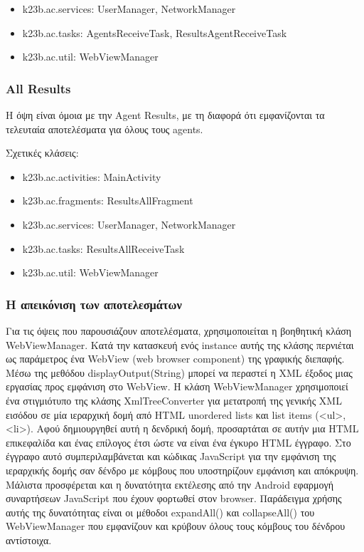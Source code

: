 \documentclass[a4paper,11pt]{article}
\begin{document}
\begin{sloppypar}
\begin{itemize}
\item k23b.ac.services: UserManager, NetworkManager

\item k23b.ac.tasks: AgentsReceiveTask, ResultsAgentReceiveTask

\item k23b.ac.util: WebViewManager

\end{itemize}

\subsubsection{All Results}
Η όψη είναι όμοια με την Agent Results, με τη διαφορά ότι εμφανίζονται τα τελευταία αποτελέσματα για όλους τους agents.
\newline

Σχετικές κλάσεις:

\begin{itemize}

\item k23b.ac.activities: MainActivity

\item k23b.ac.fragments: ResultsAllFragment

\item k23b.ac.services: UserManager, NetworkManager

\item k23b.ac.tasks: ResultsAllReceiveTask

\item k23b.ac.util: WebViewManager

\end{itemize}

\subsubsection{Η απεικόνιση των αποτελεσμάτων}

Για τις όψεις που παρουσιάζουν αποτελέσματα, χρησιμοποιείται η βοηθητική κλάση WebViewManager. Κατά την κατασκευή ενός instance αυτής της κλάσης περνιέται ως παράμετρος ένα WebView (web browser component) της γραφικής διεπαφής. Μέσω της μεθόδου displayOutput(String) μπορεί να περαστεί η XML έξοδος μιας εργασίας προς εμφάνιση στο WebView. Η κλάση WebViewManager χρησιμοποιεί ένα στιγμιότυπο της κλάσης XmlTreeConverter για μετατροπή της γενικής XML εισόδου σε μία ιεραρχική δομή από HTML unordered lists και list items (<ul>, <li>). Αφού δημιουργηθεί αυτή η δενδρική δομή, προσαρτάται σε αυτήν μια HTML επικεφαλίδα και ένας επίλογος έτσι ώστε να είναι ένα έγκυρο HTML έγγραφο. Στο έγγραφο αυτό συμπεριλαμβάνεται και κώδικας JavaScript για την εμφάνιση της ιεραρχικής δομής σαν δένδρο με κόμβους που υποστηρίζουν εμφάνιση και απόκρυψη. Μάλιστα προσφέρεται και η δυνατότητα εκτέλεσης από την Android εφαρμογή συναρτήσεων JavaScript που έχουν φορτωθεί στον browser. Παράδειγμα χρήσης αυτής της δυνατότητας είναι οι μέθοδοι expandAll() και collapseAll() του WebViewManager που εμφανίζουν και κρύβουν όλους τους κόμβους του δένδρου αντίστοιχα.


\end{sloppypar}
\end{document}
